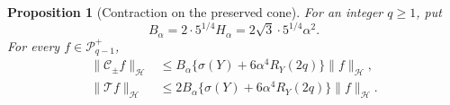 \documentclass[11pt]{article}
\newtheorem{proposition}[theorem]{Proposition}
\theoremstyle{definition}
\theoremstyle{remark}
\newcommand{\norm}[1]{\lVert#1\rVert}
\begin{document}
\begin{proposition}[Contraction on the preserved cone]
\label{mi32-contraction-proposition}
For an integer $q\ge1$, put
\begin{equation}\label{mi32-B-constant}
 B_\alpha=2\cdot5^{1/4}H_\alpha=2\sqrt3\cdot5^{1/4}\alpha^2 .
\end{equation}
For every $f\in\mathcal P_{q-1}^+$,
\begin{equation}\label{mi32-contraction}
 \begin{aligned}
 \norm{\mathcal C_\pm f}_{\mathcal H}
   &\le B_\alpha\bigl\{\sigma(Y)+6\alpha^4R_Y(2q)\bigr\}
            \norm{f}_{\mathcal H},\\
 \norm{\mathcal T f}_{\mathcal H}
   &\le2B_\alpha\bigl\{\sigma(Y)+6\alpha^4R_Y(2q)\bigr\}
            \norm{f}_{\mathcal H}.
 \end{aligned}
\end{equation}
\end{proposition}
\end{document}
